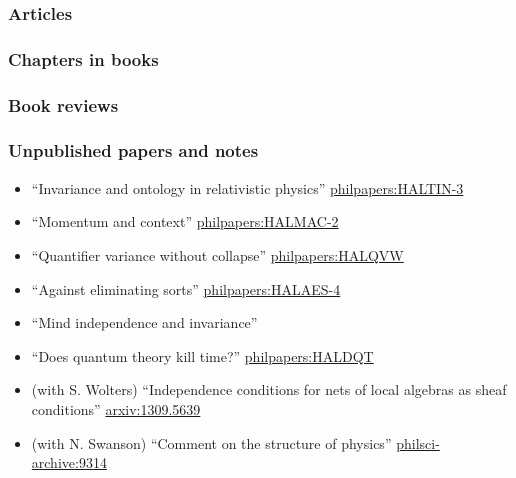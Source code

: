 \documentclass[11pt]{article}
\newcounter{npubarticle}
\newcounter{npubchapter}
\newcounter{npubreview}
\newcounter{bibnum}
\newcommand*{\pubsfrom}[1]{\setcounter{bibnum}{\numexpr\value{#1}+1\relax}}
\begin{document}
\subsubsection*{Articles}
\pubsfrom{npubarticle}
\printbibliography[heading=none,type=article,notkeyword=review]

\subsubsection*{Chapters in books}
\pubsfrom{npubchapter}
\printbibliography[heading=none,type=incollection]

\subsubsection*{Book reviews}
\pubsfrom{npubreview}
\printbibliography[heading=none,keyword=review]

\subsubsection*{Unpublished papers and notes}

\begin{itemize}

\item ``Invariance and ontology in relativistic physics''
  \href{https://philpapers.org/rec/HALTIN-3}{philpapers:HALTIN-3}

\item ``Momentum and context''
  \href{https://philpapers.org/rec/HALMAC-2}{philpapers:HALMAC-2}

\item ``Quantifier variance without collapse''
  \href{https://philpapers.org/rec/HALQVW}{philpapers:HALQVW}

\item ``Against eliminating sorts''
  \href{https://philpapers.org/rec/HALAES-4}{philpapers:HALAES-4}

\item ``Mind independence and invariance''

\item ``Does quantum theory kill time?''
  \href{https://philpapers.org/rec/HALDQT}{philpapers:HALDQT}

\item (with S. Wolters) ``Independence conditions for nets of local algebras
  as sheaf conditions''
  \href{http://arxiv.org/abs/1309.5639}{arxiv:1309.5639}

\item (with N. Swanson) ``Comment on the structure of physics''
  \href{http://philsci-archive.pitt.edu/9314}{philsci-archive:9314}

\end{itemize}
\end{document}
